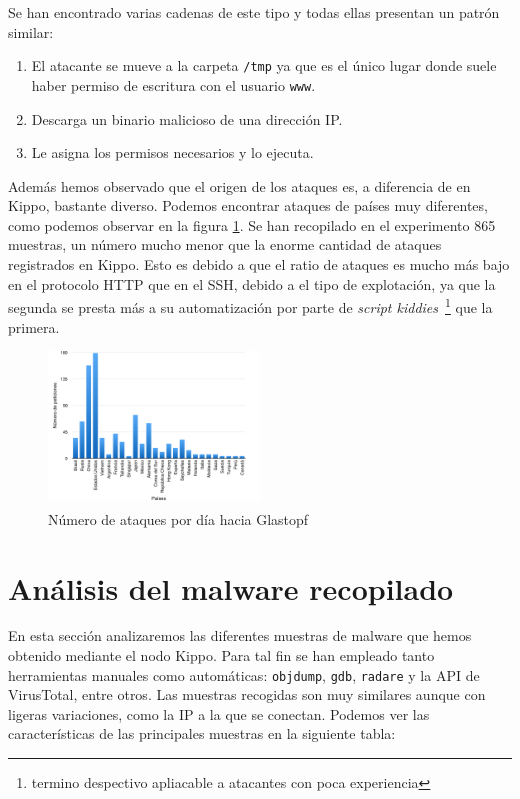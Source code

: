 \documentclass[journal]{IEEEtran}
\begin{document}
Se han encontrado varias cadenas de este tipo y todas ellas presentan un patrón similar:
\begin{enumerate}
\item El atacante se mueve a la carpeta {\tt /tmp} ya que es el único lugar donde suele haber permiso de escritura con el usuario {\tt www}.
\item Descarga un binario malicioso de una dirección IP.
\item Le asigna los permisos necesarios y lo ejecuta.
\end{enumerate}

Además hemos observado que el origen de los ataques es, a diferencia de en Kippo, bastante diverso. Podemos encontrar ataques de países muy diferentes, como podemos observar en la figura \ref{fig:glastopf}. Se han recopilado en el experimento 865 muestras, un número mucho menor que la enorme cantidad de ataques registrados en Kippo. Esto es debido a que el ratio de ataques es mucho más bajo en el protocolo HTTP que en el SSH, debido a el tipo de explotación, ya que la segunda se presta más a su automatización por parte de {\it script kiddies}~\footnote{termino despectivo apliacable a atacantes con poca experiencia} que la primera.

\begin{figure}[H]
\centering
\includegraphics[width=0.5\textwidth]{img/glastopf}
\caption{Número de ataques por día hacia Glastopf}
\label{fig:glastopf}
\end{figure}


\section{Análisis del malware recopilado}

En esta sección analizaremos las diferentes muestras de malware que hemos obtenido mediante el nodo Kippo. Para tal fin se han empleado tanto herramientas manuales como automáticas: {\tt objdump}, {\tt gdb}, {\tt radare} y la API de VirusTotal, entre otros. Las muestras recogidas son muy similares aunque con ligeras variaciones, como la IP a la que se conectan. Podemos ver las características de las principales muestras en la siguiente tabla:
\end{document}
